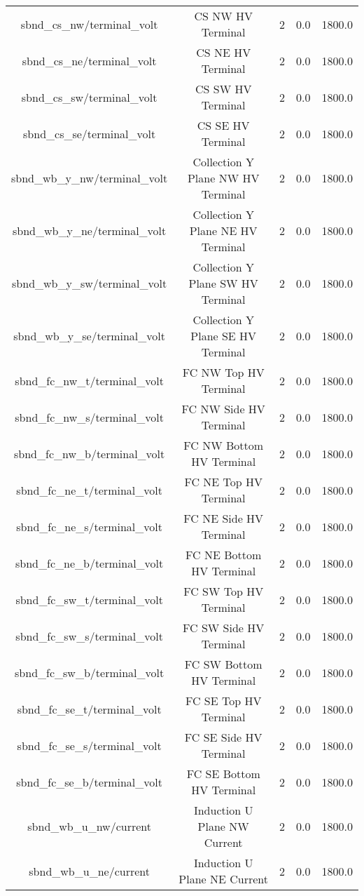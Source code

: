 \begin{center}
\begin{longtable}{c | c c c c }
sbnd\_cs\_nw/terminal\_volt & CS NW HV Terminal & 2 & 0.0 & 1800.0\\ 
sbnd\_cs\_ne/terminal\_volt & CS NE HV Terminal & 2 & 0.0 & 1800.0\\ 
sbnd\_cs\_sw/terminal\_volt & CS SW HV Terminal & 2 & 0.0 & 1800.0\\ 
sbnd\_cs\_se/terminal\_volt & CS SE HV Terminal & 2 & 0.0 & 1800.0\\ 
sbnd\_wb\_y\_nw/terminal\_volt & Collection Y Plane NW HV Terminal & 2 & 0.0 & 1800.0\\ 
sbnd\_wb\_y\_ne/terminal\_volt & Collection Y Plane NE HV Terminal & 2 & 0.0 & 1800.0\\ 
sbnd\_wb\_y\_sw/terminal\_volt & Collection Y Plane SW HV Terminal & 2 & 0.0 & 1800.0\\ 
sbnd\_wb\_y\_se/terminal\_volt & Collection Y Plane SE HV Terminal & 2 & 0.0 & 1800.0\\ 
sbnd\_fc\_nw\_t/terminal\_volt & FC NW Top HV Terminal & 2 & 0.0 & 1800.0\\ 
sbnd\_fc\_nw\_s/terminal\_volt & FC NW Side HV Terminal & 2 & 0.0 & 1800.0\\ 
sbnd\_fc\_nw\_b/terminal\_volt & FC NW Bottom HV Terminal & 2 & 0.0 & 1800.0\\ 
sbnd\_fc\_ne\_t/terminal\_volt & FC NE Top HV Terminal & 2 & 0.0 & 1800.0\\ 
sbnd\_fc\_ne\_s/terminal\_volt & FC NE Side HV Terminal & 2 & 0.0 & 1800.0\\ 
sbnd\_fc\_ne\_b/terminal\_volt & FC NE Bottom HV Terminal & 2 & 0.0 & 1800.0\\ 
sbnd\_fc\_sw\_t/terminal\_volt & FC SW Top HV Terminal & 2 & 0.0 & 1800.0\\ 
sbnd\_fc\_sw\_s/terminal\_volt & FC SW Side HV Terminal & 2 & 0.0 & 1800.0\\ 
sbnd\_fc\_sw\_b/terminal\_volt & FC SW Bottom HV Terminal & 2 & 0.0 & 1800.0\\ 
sbnd\_fc\_se\_t/terminal\_volt & FC SE Top HV Terminal & 2 & 0.0 & 1800.0\\ 
sbnd\_fc\_se\_s/terminal\_volt & FC SE Side HV Terminal & 2 & 0.0 & 1800.0\\ 
sbnd\_fc\_se\_b/terminal\_volt & FC SE Bottom HV Terminal & 2 & 0.0 & 1800.0\\ 
sbnd\_wb\_u\_nw/current & Induction U Plane NW Current & 2 & 0.0 & 1800.0\\ 
sbnd\_wb\_u\_ne/current & Induction U Plane NE Current & 2 & 0.0 & 1800.0\\ 

\end{longtable}
\end{center}

